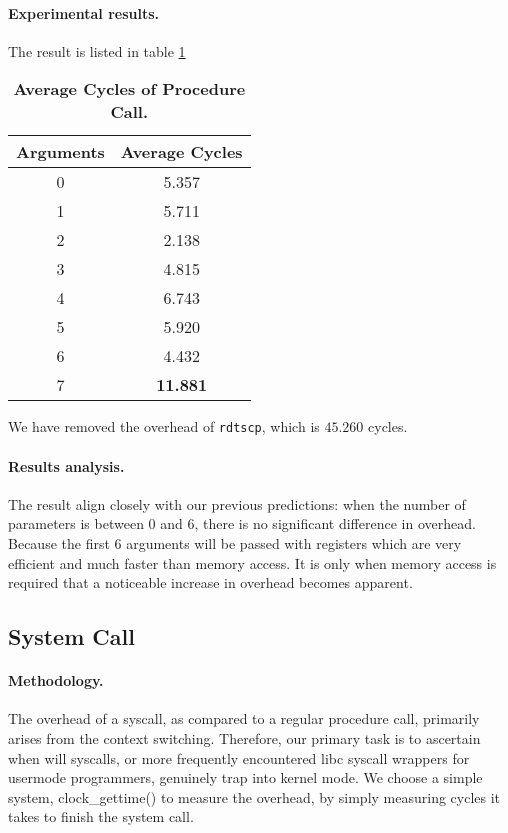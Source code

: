 \paragraph{Experimental results.} The result is listed in table \ref{table:procedure-test}
\begin{table}[h]
	\centering
	\begin{tabular}{c|c}
		\hline
		\bf{Arguments} & \bf{Average Cycles} \\ \hline
		0 & 5.357 \\ \hline
		1 & 5.711 \\ \hline
		2 & 2.138 \\ \hline
        3 & 4.815 \\ \hline
        4 & 6.743 \\ \hline
        5 & 5.920 \\ \hline
        6 & 4.432 \\ \hline
        7 & \textbf{11.881} \\ \hline
	\end{tabular}
	\caption{\textbf{Average Cycles of Procedure Call.}}
	\label{table:procedure-test}
\end{table}
We have removed the overhead of \texttt{rdtscp}, which is $45.260$ cycles. 

\paragraph{Results analysis.} The result align closely with our previous predictions: when the number of parameters is between 0 and 6, there is no significant difference in overhead. Because the first 6 arguments will be passed with registers which are very efficient and much faster than memory access. It is only when memory access is required that a noticeable increase in overhead becomes apparent.

\subsection{System Call}
\paragraph{Methodology.} The overhead of a syscall, as compared to a regular procedure call, primarily arises from the context switching. Therefore, our primary task is to ascertain when will syscalls, or more frequently encountered libc syscall wrappers for usermode programmers, genuinely trap into kernel mode. We choose a simple system, clock\_gettime() to measure the overhead, by simply measuring cycles it takes to finish the system call. 

